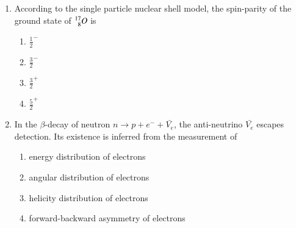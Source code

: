 \documentclass[journal]{IEEEtran}
\begin{document}
\begin{enumerate}
\\The charge density of the sphere at $\theta = 30\degree$ is
\begin{multicols}{4}
    \begin{enumerate}
        \item $\frac{3\sqrt{3}\epsilon_0E_0}{2}$
        \item $\frac{3\epsilon_0E_0}{2}$
        \item $\frac{\sqrt{3}\epsilon_0E_0}{2}$
        \item $\frac{\epsilon_0E_0}{2}$
    \end{enumerate}
\end{multicols}
\item According to the single particle nuclear shell model, the spin-parity of the ground state of $\prescript{17}{8}{O}$ is
\begin{multicols}{4}
    \begin{enumerate}
        \item $\frac{1}{2}^-$
        \item $\frac{3}{2}^-$
        \item $\frac{3}{2}^+$
        \item $\frac{5}{2}^+$
    \end{enumerate}
\end{multicols}
\item In the $\beta$-decay of neutron $n\rightarrow p+e^-+\bar{V_e}$, the anti-neutrino $\bar{V_e}$ escapes detection. Its existence is inferred from the measurement of
\begin{enumerate}
    \item energy distribution of electrons
    \item angular distribution of electrons
    \item helicity distribution of electrons 
    \item forward-backward asymmetry of electrons
\end{enumerate}
\end{enumerate}
\end{document}
